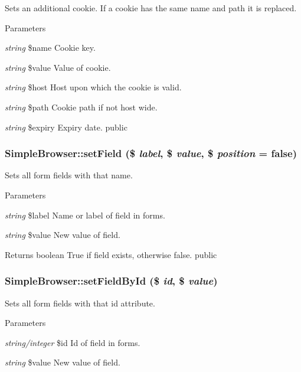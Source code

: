 Sets an additional cookie. If a cookie has the same name and path it is replaced. 
\begin{DoxyParams}{Parameters}
\item[{\em string}]\$name Cookie key. \item[{\em string}]\$value Value of cookie. \item[{\em string}]\$host Host upon which the cookie is valid. \item[{\em string}]\$path Cookie path if not host wide. \item[{\em string}]\$expiry Expiry date.  public \end{DoxyParams}
\hypertarget{class_simple_browser_a1abcef538b45e86e5d9b157b0f39234b}{
\subsubsection[{setField}]{\setlength{\rightskip}{0pt plus 5cm}SimpleBrowser::setField (\$ {\em label}, \/  \$ {\em value}, \/  \$ {\em position} = {\ttfamily false})}}
\label{class_simple_browser_a1abcef538b45e86e5d9b157b0f39234b}
Sets all form fields with that name. 
\begin{DoxyParams}{Parameters}
\item[{\em string}]\$label Name or label of field in forms. \item[{\em string}]\$value New value of field. \end{DoxyParams}
\begin{DoxyReturn}{Returns}
boolean True if field exists, otherwise false.  public 
\end{DoxyReturn}
\hypertarget{class_simple_browser_a6ed06235e6bc6f474d9934a6bba33c69}{
\subsubsection[{setFieldById}]{\setlength{\rightskip}{0pt plus 5cm}SimpleBrowser::setFieldById (\$ {\em id}, \/  \$ {\em value})}}
\label{class_simple_browser_a6ed06235e6bc6f474d9934a6bba33c69}
Sets all form fields with that id attribute. 
\begin{DoxyParams}{Parameters}
\item[{\em string/integer}]\$id Id of field in forms. \item[{\em string}]\$value New value of field. \end{DoxyParams}
